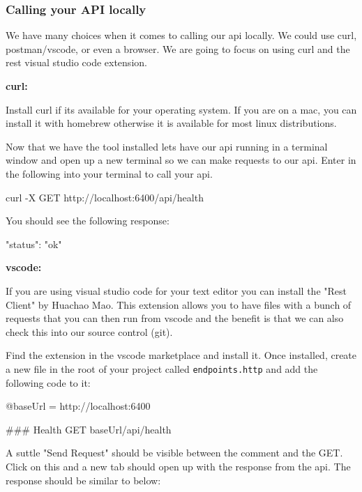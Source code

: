 \documentclass{csse4400}
\begin{document}
\subsubsection{Calling your API locally}

We have many choices when it comes to calling our api locally. We could use curl, postman/vscode, or even a browser. We are going to focus on using curl and the rest visual studio code extension.


\textbf{curl:}

Install curl if its available for your operating system. If you are on a mac, you can install it with homebrew otherwise it is available for most linux distributions.

Now that we have the tool installed lets have our api running in a terminal window and open up a new terminal so we can make requests to our api. Enter in the following into your terminal to call your api.


\begin{code}[language=bash,numbers=none]{}
curl -X GET http://localhost:6400/api/health
\end{code}

You should see the following response:

\begin{code}[language=json,numbers=none]{}
{
  "status": "ok"
}
\end{code}

\textbf{vscode:}

If you are using visual studio code for your text editor you can install the "Rest Client" by Huachao Mao. This extension allows you to have files with a bunch of requests that you can then run from vscode and the benefit is that we can also check this into our source control (git).

Find the extension in the vscode marketplace and install it. Once installed, create a new file in the root of your project called \texttt{endpoints.http} and add the following code to it:

\begin{code}[numbers=none]{}
@baseUrl = http://localhost:6400

### Health
GET {{baseUrl}}/api/health
\end{code}

A suttle "Send Request" should be visible between the comment and the GET. Click on this and a new tab should open up with the response from the api. The response should be similar to below:
\end{document}
